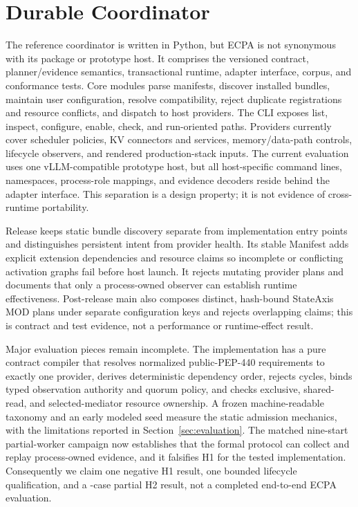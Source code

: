 \documentclass[letterpaper,twocolumn,10pt]{article}
\newcommand{\system}{\textsc{ECPA}\xspace}
\begin{document}
\section{Durable Coordinator}
The reference coordinator is written in Python, but \system is not synonymous
with its package or prototype host.  It comprises the versioned contract,
planner/evidence semantics, transactional runtime, adapter interface, corpus,
and conformance tests.  Core modules
parse manifests, discover installed bundles, maintain user configuration,
resolve compatibility, reject duplicate registrations and resource conflicts,
and dispatch to host providers.  The CLI exposes list, inspect, configure,
enable, check, and run-oriented paths.  Providers currently cover scheduler
policies, KV connectors and services, memory/data-path controls, lifecycle
observers, and rendered production-stack inputs.  The current evaluation uses
one vLLM-compatible prototype host, but all host-specific command lines,
namespaces, process-role mappings, and evidence decoders reside behind the
adapter interface.  This separation is a design property; it is not evidence
of cross-runtime portability.

Release \ECPAReleaseVersion{} keeps static bundle discovery separate from
implementation entry points and distinguishes persistent intent from provider
health.  Its stable Manifest \ECPAManifestVersion{} adds explicit extension
dependencies and resource claims so incomplete or conflicting activation
graphs fail before host launch.  It rejects mutating provider plans and
documents that only a process-owned observer can establish runtime
effectiveness.  Post-release main also composes distinct, hash-bound StateAxis
MOD plans under separate configuration keys and rejects overlapping claims;
this is contract and test evidence, not a performance or runtime-effect result.

Major evaluation pieces remain incomplete.  The implementation has a
pure contract compiler that resolves normalized public-PEP-440 requirements to
exactly one provider, derives deterministic dependency order, rejects cycles,
binds typed observation authority and quorum policy, and checks exclusive,
shared-read, and selected-mediator resource ownership.  A frozen
machine-readable taxonomy and an early modeled seed measure
the static admission mechanics, with the limitations reported in
Section~\ref{sec:evaluation}.  The matched nine-start partial-worker campaign
now establishes that the formal protocol can collect and replay process-owned
evidence, and it falsifies H1 for the tested implementation.  Consequently we
claim one negative H1 result, one bounded lifecycle qualification, and a
\ECPAHTwoScoredCases{}-case partial H2 result, not a completed end-to-end \system evaluation.
\end{document}
